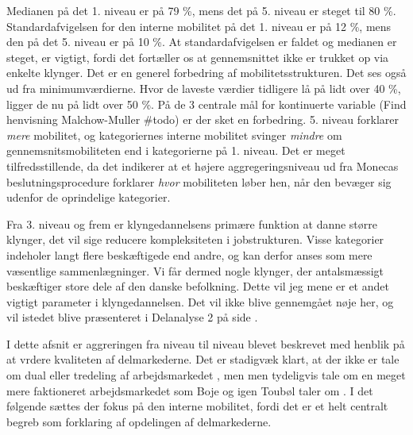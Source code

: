 Medianen på det 1. niveau er på 79 \%, mens det på 5. niveau er steget til 80 \%. Standardafvigelsen for den interne mobilitet på det 1. niveau er på 12 \%, mens den på det 5. niveau er på 10 \%. At standardafvigelsen er faldet og medianen er steget, er vigtigt, fordi det fortæller os at gennemsnittet ikke er trukket op via enkelte klynger.  Det er en generel forbedring af mobilitetsstrukturen. Det ses også ud fra minimumværdierne. Hvor de laveste værdier tidligere lå på lidt over 40 \%, ligger de nu på lidt over 50 \%. På de 3 centrale mål for kontinuerte variable (Find henvisning Malchow-Muller \#todo) er der sket en forbedring. 5. niveau forklarer \emph{mere} mobilitet, og kategoriernes interne mobilitet svinger \emph{mindre} om gennemsnitsmobiliteten end i kategorierne på 1. niveau. Det er meget tilfredsstillende, da det indikerer at et højere aggregeringsniveau ud fra Monecas beslutningsprocedure forklarer \emph{hvor} mobiliteten løber hen, når den bevæger sig udenfor de oprindelige kategorier.  %

Fra 3. niveau og frem er klyngedannelsens primære funktion at danne større klynger, det vil sige reducere kompleksiteten i jobstrukturen. Visse kategorier indeholer langt flere beskæftigede end andre, og kan derfor anses som mere væsentlige sammenlægninger. Vi får dermed nogle klynger, der antalsmæssigt beskæftiger store dele af den danske befolkning. Dette vil jeg mene er et andet vigtigt parameter i klyngedannelsen. Det vil ikke blive gennemgået nøje her, og vil istedet blive præsenteret i Delanalyse 2 på side \pageref{kap_delanalyse2_socialeprocesser}.

I dette afsnit er aggreringen fra niveau til niveau blevet beskrevet med henblik på at vrdere kvaliteten af delmarkederne. Det er stadigvæk klart, at der ikke er tale om dual eller tredeling af arbejdsmarkedet \parencite{Piore1980, Gordon1982}, men men tydeligvis tale om en meget mere faktioneret arbejdsmarkedet som Boje og igen Toubøl taler om \parencite{Boje1985, Touboel2013}. I det følgende sættes der fokus på den interne mobilitet, fordi det er et helt centralt begreb som forklaring af opdelingen af delmarkederne.


